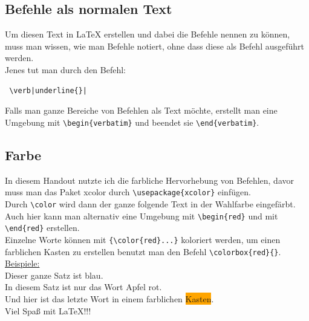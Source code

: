 \documentclass{report}
\begin{document}
\subsection*{Befehle als normalen Text}
Um diesen Text in \LaTeX{} erstellen und dabei die Befehle nennen zu können, muss man wissen, wie man Befehle notiert, ohne dass diese als Befehl ausgeführt werden.\\
Jenes tut man durch den Befehl:\\
\color{blue}
\begin{verbatim} \verb|underline{}| \end{verbatim}
\color{black}
Falls man ganze Bereiche von Befehlen als Text möchte, erstellt man eine Umgebung mit {\color{blue}\verb|\begin{verbatim}|} und beendet sie {\color{blue}\verb|\end{verbatim}|}.

\subsection*{Farbe}
In diesem Handout nutzte ich die farbliche Hervorhebung von Befehlen, davor muss man das Paket {\color{blue}xcolor} durch {\color{blue}\verb|\usepackage{xcolor}|} einfügen.\\
Durch {\color{blue}\verb|\color|} wird dann der ganze folgende Text in der Wahlfarbe eingefärbt.\\
Auch hier kann man alternativ eine Umgebung mit {\color{blue}\verb|\begin{red}|} und mit {\color{blue}\verb|\end{red}|} erstellen.\\
Einzelne Worte können mit {\color{blue}\verb|{\color{red}...}|} koloriert werden, um einen farblichen Kasten zu erstellen benutzt man den Befehl {\color{blue}\verb|\colorbox{red}{}|}.\\
\underline{Beispiele:}\\
\color{blue} Dieser ganze Satz ist blau.\\
\color{black}
In diesem Satz ist nur das Wort {\color{red} Apfel} rot.\\
Und hier ist das letzte Wort in einem farblichen \colorbox{orange}{Kasten}.\\
\vspace{1cm}
\huge Viel Spaß mit \LaTeX{!!!}
\end{document}
